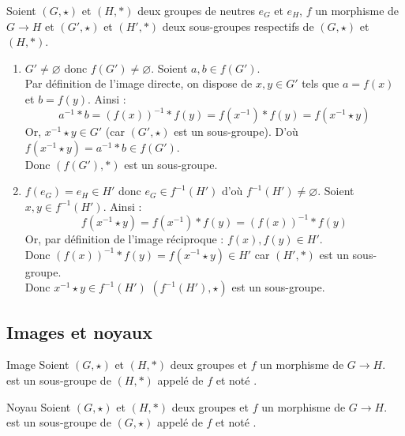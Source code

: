 \documentclass[12pt,a4paper]{report}
\begin{document}
    \begin{demo}[Démonstrations]
    Soient $(G, \star)$ et $(H, \ast)$ deux groupes de neutres $e_G$ et $e_H$, $f$ un morphisme de $G \rightarrow H$ et $(G', \star)$ et $(H', \ast)$ deux sous-groupes respectifs de $(G, \star)$ et $(H, \ast)$.
    \begin{enumerate}[label=\bfseries\arabic*)]
        \item $G' \neq \varnothing$ donc $f(G') \neq \varnothing$. Soient $a, b \in f(G')$.\\
    Par définition de l'image directe, on dispose de $x, y \in G'$ tels que $a = f(x)$ et $b = f(y)$. Ainsi :
    $$ a^{-1} \ast b = (f(x))^{-1} \ast f(y) = f\left( x^{-1} \right) \ast f(y) = f\left( x^{-1} \star y\right) $$
    Or, $x^{-1} \star y \in G'$ (car $(G', \star)$ est un sous-groupe). D'où $f\left( x^{-1} \star y\right) = a^{-1} \ast b \in f(G')$.\\
    Donc $(f(G'), \ast)$ est un sous-groupe.
        \item $f(e_G) = e_H \in H'$ donc $e_G \in f^{-1}(H')$ d'où $f^{-1}(H') \neq \varnothing$. Soient $x, y \in f^{-1}(H')$. Ainsi :
        $$ f\left(x^{-1} \star y\right) = f\left(x^{-1}\right) \ast f(y) = (f(x))^{-1} \ast f(y) $$
        Or, par définition de l'image réciproque : $f(x), f(y) \in H'$.\\
        Donc $(f(x))^{-1} \ast f(y) = f\left(x^{-1} \star y\right) \in H'$ car $(H', \ast)$ est un sous-groupe.\\
        Donc $x^{-1} \star y \in f^{-1}(H')$ \ie $(f^{-1}(H'), \star)$ est un sous-groupe.
    \end{enumerate}
    \end{demo}
    
    
    \subsection{Images et noyaux}
    
    \begin{definition}{Image}{}
    Soient $(G, \star)$ et $(H, \ast)$ deux groupes et $f$ un morphisme de $G \rightarrow H$.\\
     est un sous-groupe de $(H, \ast)$ appelé  de $f$ et noté .
    \end{definition}
    
    \begin{definition}{Noyau}{}
    Soient $(G, \star)$ et $(H, \ast)$ deux groupes et $f$ un morphisme de $G \rightarrow H$.\\
     est un sous-groupe de $(G, \star)$ appelé  de $f$ et noté .
    \end{definition}
    
\end{document}
